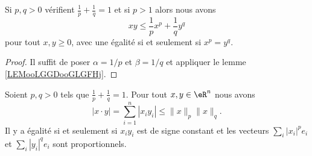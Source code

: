 \begin{corollary}       \label{CORooTCBZooAcZxaC}
	Si \( p,q>0\) vérifient \( \frac{1}{ p }+\frac{1}{ q }=1\) et si \( p>1\) alors nous avons
	\begin{equation}        \label{EQooWKTSooQwRsLz}
		xy\leq \frac{1}{ p }x^{p}+\frac{1}{ q }y^q
	\end{equation}
	pour tout \( x,y\geq 0\), avec une égalité si et seulement si \( x^p=y^q\).
\end{corollary}

\begin{proof}
	Il suffit de poser \( \alpha=1/p\) et \( \beta=1/q\) et appliquer le lemme \ref{LEMooLGGDooGLGFHj}.
\end{proof}

\begin{theorem}        \label{THOooYHMJooBlXfpl}
	Soient \( p,q>0\) tels que \( \frac{1}{ p }+\frac{1}{ q }=1\). Pour tout \( x,y\in \eR^n\) nous avons
	\begin{equation}
		| x\cdot y |=\sum_{i=1}^n| x_iy_i |\leq \| x \|_p\| x \|_q.
	\end{equation}
	Il y a égalité si et seulement si \( x_iy_i\) est de signe constant et les vecteurs \( \sum_i| x_i |^pe_i\) et \( \sum_i| y_i |^qe_i\) sont proportionnels.
\end{theorem}

